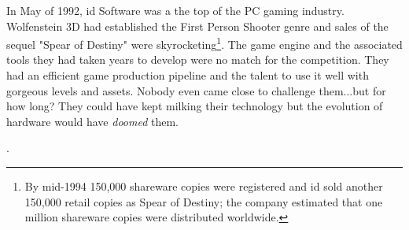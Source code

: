 In May of 1992, id Software was a the top of the PC gaming industry. Wolfenstein 3D had established the First
Person Shooter genre and sales of the sequel "Spear of Destiny" were skyrocketing\footnote{By mid-1994 150,000 shareware copies were registered and id sold another 150,000 retail copies as Spear of Destiny; the company estimated that one million shareware copies were distributed worldwide.}. The game engine and the associated 
tools they had taken years to develop were no match for the competition. They had an efficient game production pipeline and the talent to use it well with gorgeous levels and assets. Nobody even came close to challenge them...but for how long? They could have kept milking their technology but the evolution of hardware would have \textit{doomed} them.\\
\par

\par
{}. \\
\par


